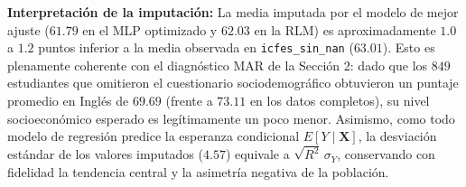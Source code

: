 \documentclass[11pt,letterpaper]{article}
\begin{document}
\textbf{Interpretación de la imputación:}
La media imputada por el modelo de mejor ajuste ($61.79$ en el MLP optimizado y $62.03$ en la RLM) es aproximadamente $1.0$ a $1.2$ puntos inferior a la media observada en \texttt{icfes\_sin\_nan} ($63.01$). Esto es plenamente coherente con el diagnóstico MAR de la Sección 2: dado que los $849$ estudiantes que omitieron el cuestionario sociodemográfico obtuvieron un puntaje promedio en Inglés de $69.69$ (frente a $73.11$ en los datos completos), su nivel socioeconómico esperado es legítimamente un poco menor. Asimismo, como todo modelo de regresión predice la esperanza condicional $E[Y\mid \mathbf{X}]$, la desviación estándar de los valores imputados ($4.57$) equivale a $\sqrt{R^2}\,\sigma_Y$, conservando con fidelidad la tendencia central y la asimetría negativa de la población.
\end{document}
